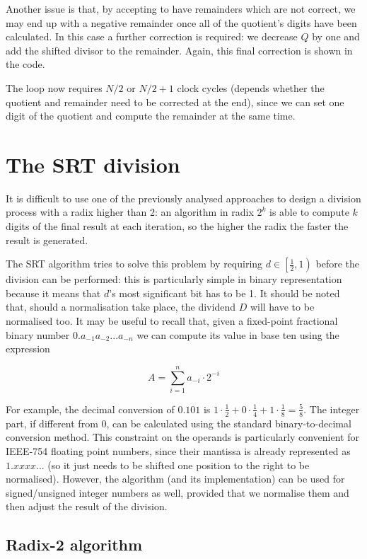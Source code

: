 Another issue is that, by accepting to have remainders which are not correct, we may end up with a negative remainder once all of the quotient's digits have been calculated.
In this case a further correction is required: we decrease $Q$ by one and add the shifted divisor to the remainder.
Again, this final correction is shown in the code.

The loop now requires $N/2$ or $N/2+1$ clock cycles (depends whether the quotient and remainder need to be corrected at the end), since we can set one digit of the quotient and compute the remainder at the same time. 

\section{The SRT division}

It is difficult to use one of the previously analysed approaches to design a division process with a radix higher than 2: an algorithm in radix $2^k$ is able to compute $k$ digits of the final result at each iteration, so the higher the radix the faster the result is generated. 

The SRT algorithm tries to solve this problem by requiring $d \in \left[ \frac{1}{2}, 1\right)$ before the division can be performed: this is particularly simple in binary representation because it means that $d$'s most significant bit has to be 1.
It should be noted that, should a normalisation take place, the dividend $D$ will have to be normalised too.
It may be useful to recall that, given a fixed-point fractional binary number $0.a_{-1}a_{-2}...a_{-n}$ we can compute its value in base ten using the expression 

\[
    A = \sum_{i=1}^{n} a_{-i} \cdot 2^{-i}
\]

For example, the decimal conversion of $0.101$ is $1 \cdot \frac{1}{2}+0 \cdot \frac{1}{4}+ 1 \cdot \frac{1}{8} = \frac{5}{8}$.
The integer part, if different from 0, can be calculated using the standard binary-to-decimal conversion method.
This constraint on the operands is particularly convenient for IEEE-754 floating point numbers, since their mantissa is already represented as $1.xxxx...$ (so it just needs to be shifted one position to the right to be normalised).
However, the algorithm (and its implementation) can be used for signed/unsigned integer numbers as well, provided that we normalise them and then adjust the result of the division.

\subsection{Radix-2 algorithm}

